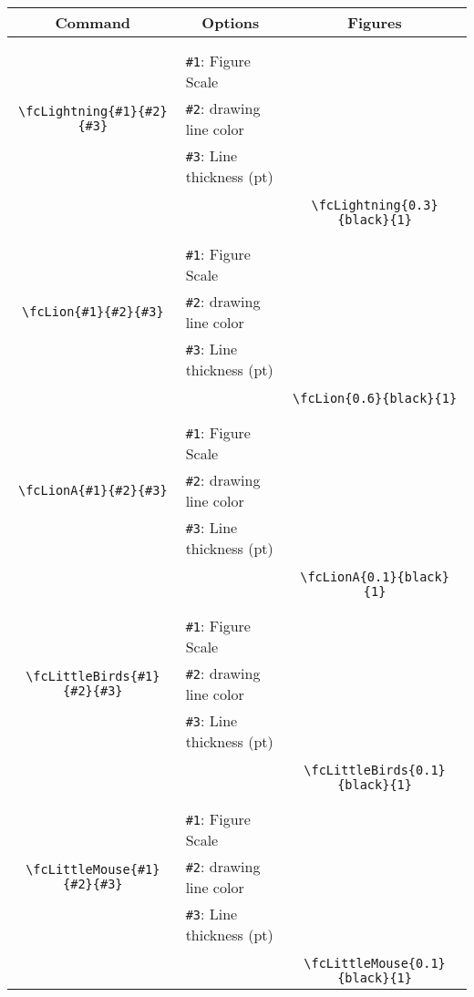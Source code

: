 \documentclass[x11names]{article}
\begin{document}
\begin{table}[H]\centering\begin{tabular}{|c|l|c|}\hline {\bf Command}& \multicolumn{1}{c|}{{\bf Options}} & {\bf Figures}\\  \hline	&&\multirow{5}{*}{\fcLightning{0.3}{black}{1}}\\	&&\\	&\verb|#1|: Figure Scale &\\	\verb|\fcLightning{#1}{#2}{#3}|&	\verb|#2|: drawing line color &\\	&\verb|#3|: Line thickness (pt) &\\ &&\\&&	\verb|\fcLightning{0.3}{black}{1}|\\\hline 	
	&&\multirow{5}{*}{\fcLion{0.6}{black}{1}}\\	&&\\	&\verb|#1|: Figure Scale &\\	\verb|\fcLion{#1}{#2}{#3}|&	\verb|#2|: drawing line color &\\	&\verb|#3|: Line thickness (pt) &\\ &&\\&&	\verb|\fcLion{0.6}{black}{1}|\\\hline 	
	&&\multirow{5}{*}{\fcLionA{0.1}{black}{1}}\\	&&\\	&\verb|#1|: Figure Scale &\\	\verb|\fcLionA{#1}{#2}{#3}|&	\verb|#2|: drawing line color &\\	&\verb|#3|: Line thickness (pt) &\\ &&\\&&	\verb|\fcLionA{0.1}{black}{1}|\\\hline 	
	&&\multirow{5}{*}{\fcLittleBirds{0.1}{black}{1}}\\	&&\\	&\verb|#1|: Figure Scale &\\	\verb|\fcLittleBirds{#1}{#2}{#3}|&	\verb|#2|: drawing line color &\\	&\verb|#3|: Line thickness (pt) &\\ &&\\&&	\verb|\fcLittleBirds{0.1}{black}{1}|\\\hline 	
	&&\multirow{5}{*}{\fcLittleMouse{0.1}{black}{1}}\\	&&\\	&\verb|#1|: Figure Scale &\\	\verb|\fcLittleMouse{#1}{#2}{#3}|&	\verb|#2|: drawing line color &\\	&\verb|#3|: Line thickness (pt) &\\ &&\\&&	\verb|\fcLittleMouse{0.1}{black}{1}|\\\hline 	

\end{tabular}
\end{table}
\end{document}

